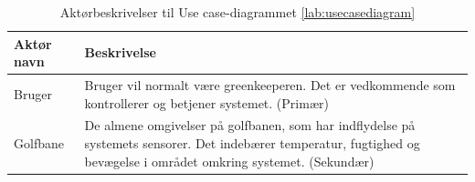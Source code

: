 \begin{table}[!htbp] \centering
	\begin{tabular}{|p{2.5cm}|p{11.5cm}|}
	\hline
		\textbf{Aktør navn} & \textbf{Beskrivelse} \\\hline
		Bruger & Bruger vil normalt være greenkeeperen. Det er vedkommende som kontrollerer og betjener systemet. (Primær) \\\hline

		Golfbane & De almene omgivelser på golfbanen, som har indflydelse på systemets sensorer. Det indebærer temperatur, fugtighed og bevægelse i området omkring systemet. (Sekundær) \\\hline
	\end{tabular}
	\caption{Aktørbeskrivelser til Use case-diagrammet \ref{lab:usecasediagram}}
	\label{tabel:aktor}
\end{table}

